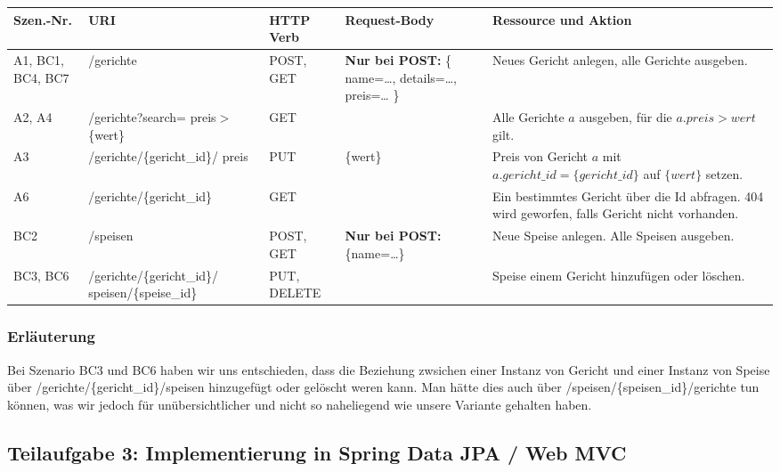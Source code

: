 \begin{tabu} to 
\hline
{}
Szen.-Nr. &URI &HTTP Verb &Request-Body &Ressource und
  Aktion \\
\hline
A1, BC1, BC4, BC7 &/gerichte &POST, GET
  &\textbf{Nur bei POST:}
    \{
      name=\dots,
      details=\dots,
      preis=\dots
    \}
  &Neues Gericht anlegen, alle Gerichte ausgeben. \\
\hline
A2, A4 &/gerichte?search= preis$>$\{wert\} &GET & &Alle
  Gerichte $a$ ausgeben, f\"ur die $a.preis > wert$ gilt.
  \\
\hline
A3 &/gerichte/\{gericht\_id\}/ preis &PUT &\{wert\} &Preis
  von Gericht $a$ mit $a.gericht\_id=\{gericht\_id\}$ auf
  $\{wert\}$ setzen. \\
\hline
A6 &/gerichte/\{gericht\_id\} &GET & &Ein bestimmtes
  Gericht \"uber die Id
  abfragen. 404 wird geworfen, falls Gericht nicht
  vorhanden. \\
\hline
BC2 &/speisen &POST, GET
  &\textbf{Nur bei POST:}
  \{name=\dots\}
  &Neue Speise anlegen. Alle Speisen ausgeben. \\
\hline
BC3, BC6 &/gerichte/\{gericht\_id\}/ speisen/\{speise\_id\}
  &PUT, DELETE & &Speise einem Gericht hinzuf\"ugen oder
  l\"oschen. \\
\end{tabu}

\subsubsection*{Erl\"auterung}

Bei Szenario BC3 und BC6 haben wir uns entschieden, dass
die Beziehung zwsichen einer Instanz von Gericht und einer
Instanz von Speise \"uber /gerichte/\{gericht\_id\}/speisen
hinzugef\"ugt oder gel\"oscht weren kann. Man h\"atte dies
auch \"uber /speisen/\{speisen\_id\}/gerichte tun k\"onnen,
was wir jedoch f\"ur un\"ubersichtlicher und nicht so
naheliegend wie unsere Variante gehalten haben.


\newpage

\subsection{Teilaufgabe 3: Implementierung in Spring Data
  JPA / Web MVC}

